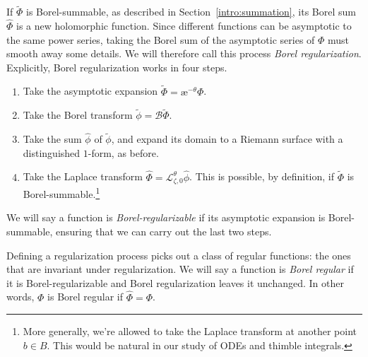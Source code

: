 \documentclass{article}
\newcommand{\series}[1]{\tilde{#1}}
\newcommand{\laplace}{\mathcal{L}}
\newcommand{\borel}{\mathcal{B}}
\newcommand{\aexp}{\text{\ae}}
\theoremstyle{definition}
\theoremstyle{plain}
\begin{document}
\begin{center}
\end{center}
If $\series{\Phi}$ is Borel-summable, as described in Section~\ref{intro:summation}, its Borel sum $\hat{\Phi}$ is a new holomorphic function.
Since different functions can be asymptotic to the same power series, taking the Borel sum of the asymptotic series of $\Phi$ must smooth away some details. We will therefore call this process {\em Borel regularization}. Explicitly, Borel regularization works in four steps.
\begin{enumerate}
\item Take the asymptotic expansion $\series{\Phi} = \aexp^{-\theta} \Phi$.
\item Take the Borel transform $\series{\phi} = \borel \series{\Phi}$.
\item Take the sum $\hat{\phi}$ of $\series{\phi}$, and expand its domain to a Riemann surface with a distinguished $1$-form, as before.%
\item Take the Laplace transform $\hat{\Phi} = \laplace_{\zeta, 0}^\theta \hat{\phi}$. This is possible, by definition, if $\series{\Phi}$ is Borel-summable.\footnote{More generally, we're allowed to take the Laplace transform at another point $b \in B$. This would be natural in our study of ODEs and thimble integrals.}
\end{enumerate}
We will say a function is {\em Borel-regularizable} if its asymptotic expansion is Borel-summable, ensuring that we can carry out the last two steps.

Defining a regularization process picks out a class of regular functions: the ones that are invariant under regularization. We will say a function is {\em Borel regular} if it is Borel-regularizable and Borel regularization leaves it unchanged. In other words, $\Phi$ is Borel regular if $\hat{\Phi} = \Phi$.
\end{document}
